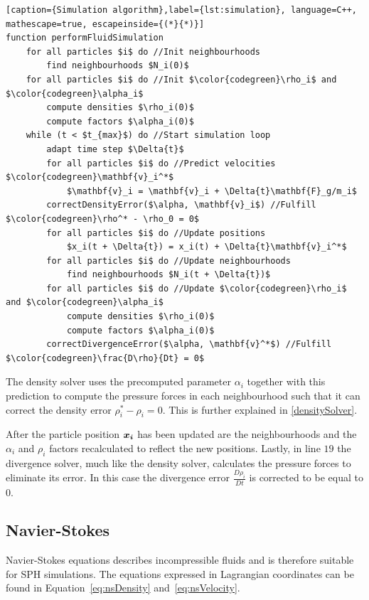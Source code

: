 \begin{lstlisting}[caption={Simulation algorithm},label={lst:simulation}, language=C++, mathescape=true, escapeinside={(*}{*)}] 
function performFluidSimulation
    for all particles $i$ do //Init neighbourhoods
        find neighbourhoods $N_i(0)$
    for all particles $i$ do //Init $\color{codegreen}\rho_i$ and $\color{codegreen}\alpha_i$
        compute densities $\rho_i(0)$
        compute factors $\alpha_i(0)$
    while (t < $t_{max}$) do //Start simulation loop
        adapt time step $\Delta{t}$ 
        for all particles $i$ do //Predict velocities $\color{codegreen}\mathbf{v}_i^*$
            $\mathbf{v}_i = \mathbf{v}_i + \Delta{t}\mathbf{F}_g/m_i$
        correctDensityError($\alpha, \mathbf{v}_i$) //Fulfill $\color{codegreen}\rho^* - \rho_0 = 0$
        for all particles $i$ do //Update positions
            $x_i(t + \Delta{t}) = x_i(t) + \Delta{t}\mathbf{v}_i^*$
        for all particles $i$ do //Update neighbourhoods
            find neighbourhoods $N_i(t + \Delta{t})$
        for all particles $i$ do //Update $\color{codegreen}\rho_i$ and $\color{codegreen}\alpha_i$ 
            compute densities $\rho_i(0)$
            compute factors $\alpha_i(0)$
        correctDivergenceError($\alpha, \mathbf{v}^*$) //Fulfill $\color{codegreen}\frac{D\rho}{Dt} = 0$
\end{lstlisting}

The density solver uses the precomputed parameter $\alpha_i$ together with this prediction to compute the pressure forces in each neighbourhood such that it can correct the density error $\rho_i^* - \rho_i = 0$. This is further explained in \ref{densitySolver}. 

After the particle position $\bm{x_i}$ has been updated are the neighbourhoods and the $\alpha_i$ and $\rho_i$ factors recalculated to reflect the new positions. Lastly, in line $19$ the divergence solver, much like the density solver, calculates the pressure forces to eliminate its error. In this case the divergence error $\frac{D\rho_i}{Dt}$ is corrected to be equal to $0$.

\subsection{Navier-Stokes}
    Navier-Stokes equations describes incompressible fluids and is therefore suitable for SPH simulations. The equations expressed in Lagrangian coordinates can be found in Equation~\ref{eq:nsDensity} and~\ref{eq:nsVelocity}.

